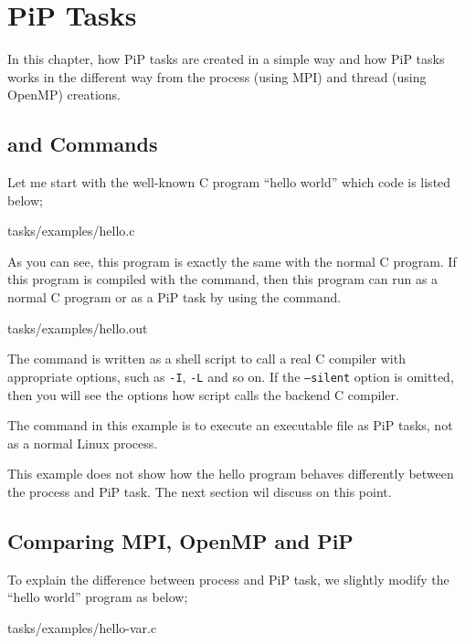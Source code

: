 
\section{PiP Tasks}

In this chapter, how PiP tasks are created in a simple way and how PiP
tasks works in the different way from the process (using MPI) and
thread (using OpenMP) creations.

\subsection{ and  Commands}

Let me start with the well-known C program ``hello world'' which code
is listed below;


                {tasks/examples/hello.c}

As you can see, this program is exactly the same with the normal C
program. If this program is compiled with the  command,
then this program can run as a normal C program or as a PiP task by
using the  command.


                {tasks/examples/hello.out}

The  command is written as a shell script to call a real
C compiler with appropriate options, such as {\tt -I}, {\tt -L} and so
on. If the {\tt --silent} option is omitted, then you will see the
options how  script calls the backend C compiler.

The  command in this example is to execute an
executable file as PiP tasks, not as a normal Linux process.

This example does not show how the hello program behaves differently
between the process and PiP task. The next section wil discuss on this
point.

\subsection{Comparing MPI, OpenMP and PiP}

To explain the difference between process and PiP task, we slightly
modify the ``hello world'' program as below;

 {tasks/examples/hello-var.c}

